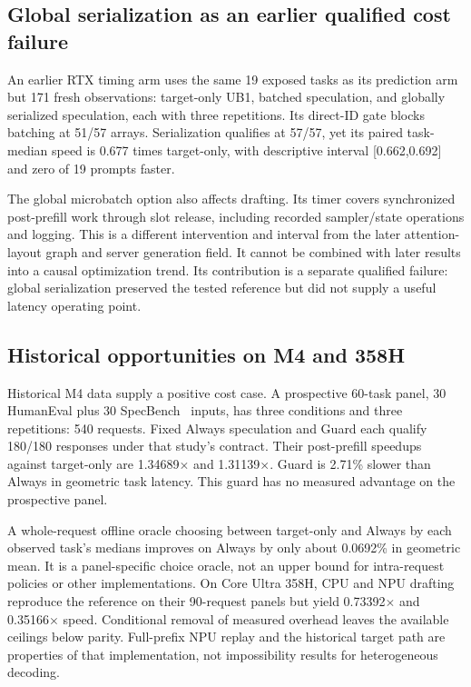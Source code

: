 \subsection{Global serialization as an earlier qualified cost failure}
An earlier RTX timing arm uses the same 19 exposed tasks as its prediction arm but 171 fresh observations: target-only UB1, batched speculation, and globally serialized speculation, each with three repetitions. Its direct-ID gate blocks batching at 51/57 arrays. Serialization qualifies at 57/57, yet its paired task-median speed is 0.677 times target-only, with descriptive interval [0.662,0.692] and zero of 19 prompts faster.

The global microbatch option also affects drafting. Its timer covers synchronized post-prefill work through slot release, including recorded sampler/state operations and logging. This is a different intervention and interval from the later attention-layout graph and server generation field. It cannot be combined with later results into a causal optimization trend. Its contribution is a separate qualified failure: global serialization preserved the tested reference but did not supply a useful latency operating point.

\subsection{Historical opportunities on M4 and 358H}
Historical M4 data supply a positive cost case. A prospective 60-task panel, 30 HumanEval plus 30 SpecBench~\cite{specbench} inputs, has three conditions and three repetitions: 540 requests. Fixed Always speculation and Guard each qualify 180/180 responses under that study's contract. Their post-prefill speedups against target-only are 1.34689$\times$ and 1.31139$\times$. Guard is 2.71\% slower than Always in geometric task latency. This guard has no measured advantage on the prospective panel.

A whole-request offline oracle choosing between target-only and Always by each observed task's medians improves on Always by only about 0.0692\% in geometric mean. It is a panel-specific choice oracle, not an upper bound for intra-request policies or other implementations. On Core Ultra 358H, CPU and NPU drafting reproduce the reference on their 90-request panels but yield 0.73392$\times$ and 0.35166$\times$ speed. Conditional removal of measured overhead leaves the available ceilings below parity. Full-prefix NPU replay and the historical target path are properties of that implementation, not impossibility results for heterogeneous decoding.


